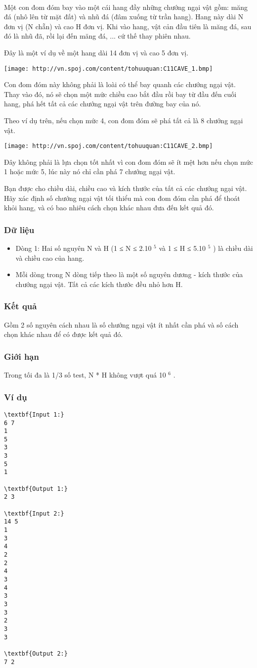 

 

Một con đom đóm bay vào một cái hang đầy những chướng ngại vật gồm: măng đá (nhô lên từ mặt đất) và nhũ đá (đâm xuống từ trần hang). Hang này dài N đơn vị (N chẵn) và cao H đơn vị. Khi vào hang, vật cản đầu tiên là măng đá, sau đó là nhũ đã, rồi lại đến măng đá, ... cứ thế thay phiên nhau.

Đây là một ví dụ về một hang dài 14 đơn vị và cao 5 đơn vị.


\texttt{[image: http://vn.spoj.com/content/tohuuquan:C11CAVE\_1.bmp]}

Con đom đóm này không phải là loài có thể bay quanh các chướng ngại vật. Thay vào đó, nó sẽ chọn một mức chiều cao bắt đầu rồi bay từ đầu đến cuối hang, phá hết tất cả các chướng ngại vật trên đường bay của nó.

Theo ví dụ trên, nếu chọn mức 4, con đom đóm sẽ phá tất cả là 8 chướng ngại vật.


\texttt{[image: http://vn.spoj.com/content/tohuuquan:C11CAVE\_2.bmp]}

Đây không phải là lựa chọn tốt nhất vì con đom đóm sẽ ít mệt hơn nếu chọn mức 1 hoặc mức 5, lúc này nó chỉ cần phá 7 chướng ngại vật.

Bạn được cho chiều dài, chiều cao và kích thước của tất cả các chướng ngại vật. Hãy xác định số chướng ngại vật tối thiểu mà con đom đóm cần phá để thoát khỏi hang, và có bao nhiêu cách chọn khác nhau đưa đến kết quả đó.

\subsubsection{Dữ liệu}
\begin{itemize}
	\item Dòng 1: Hai số nguyên N và H (1 ≤ N ≤ 2.10 $^ 5 $ và 1 ≤ H ≤ 5.10 $^ 5 $ ) là chiều dài và chiều cao của hang.
	\item Mỗi dòng trong N dòng tiếp theo là một số nguyên dương - kích thước của chướng ngại vật. Tất cả các kích thước đều nhỏ hơn H.
\end{itemize}

\subsubsection{Kết quả}

Gồm 2 số nguyên cách nhau là số chướng ngại vật ít nhất cần phá và số cách chọn khác nhau để có được kết quả đó.

\subsubsection{Giới hạn}

Trong tối đa là 1/3 số test, N * H không vượt quá 10 $^ 6 $ .

\subsubsection{Ví dụ}
\begin{verbatim}
\textbf{Input 1:}
6 7
1
5
3
3
5
1

\textbf{Output 1:}
2 3 

\textbf{Input 2:}
14 5
1
3
4
2
2
4
3
4
3
3
3
2
3
3

\textbf{Output 2:}
7 2\end{verbatim}